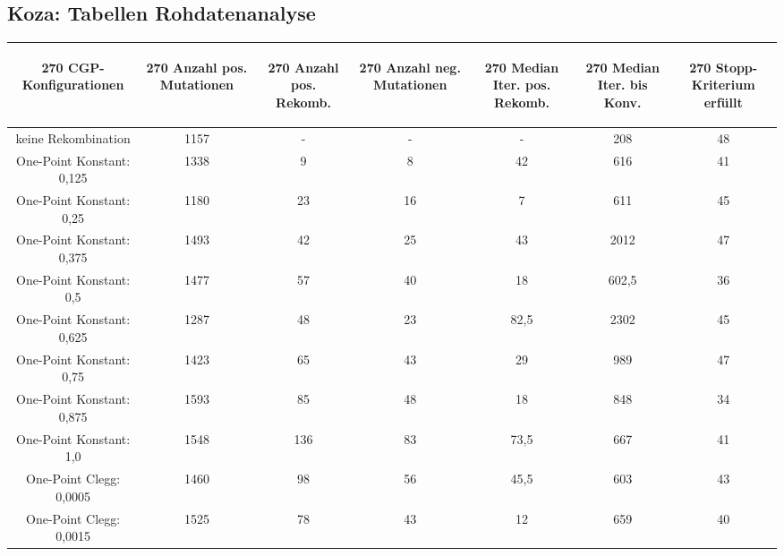 \subsection{Koza: Tabellen Rohdatenanalyse}
\label{subsec:appendixTabellenRohdatenanalyseKoza}
\begin{table}[H]
	\centering
	\begin{tabular}{c | c | c | c | c | c | c}
		\begin{turn}{270} \textbf{CGP-Konfigurationen} \end{turn} & \begin{turn}{270} \textbf{Anzahl pos. Mutationen} \end{turn} & \begin{turn}{270} \textbf{Anzahl pos. Rekomb.} \end{turn} & \begin{turn}{270} \textbf{Anzahl neg. Mutationen} \end{turn} & \begin{turn}{270} \textbf{Median Iter. pos. Rekomb.} \end{turn} & \begin{turn}{270} \textbf{Median Iter. bis Konv.} \end{turn} & \begin{turn}{270} \textbf{Stopp-Kriterium erfüllt} \end{turn}\\
		\hline
		keine Rekombination & 1157 & - & - & - & 208 & 48\\
		\hline
		\hline
		One-Point Konstant: 0,125 & 1338 & 9 & 8 & 42 & 616 & 41\\
		\hline
		One-Point Konstant: 0,25 & 1180 & 23 & 16 & 7 & 611 & 45\\
		\hline
		One-Point Konstant: 0,375 & 1493 & 42 & 25 & 43 & 2012 & 47\\
		\hline
		One-Point Konstant: 0,5 & 1477 & 57 & 40 & 18 & 602,5 & 36\\
		\hline
		One-Point Konstant: 0,625 & 1287 & 48 & 23 & 82,5 & 2302 & 45\\
		\hline
		One-Point Konstant: 0,75 & 1423 & 65 & 43 & 29 & 989 & 47\\
		\hline
		One-Point Konstant: 0,875 & 1593 & 85 & 48 & 18 & 848 & 34\\
		\hline
		One-Point Konstant: 1,0 & 1548 & 136 & 83 & 73,5 & 667 & 41\\
		\hline
		\hline
		One-Point Clegg: 0,0005 & 1460 & 98 & 56 & 45,5 & 603 & 43\\
		\hline
		One-Point Clegg: 0,0015 & 1525 & 78 & 43 & 12 & 659 & 40\\

\end{tabular}
\end{table}
